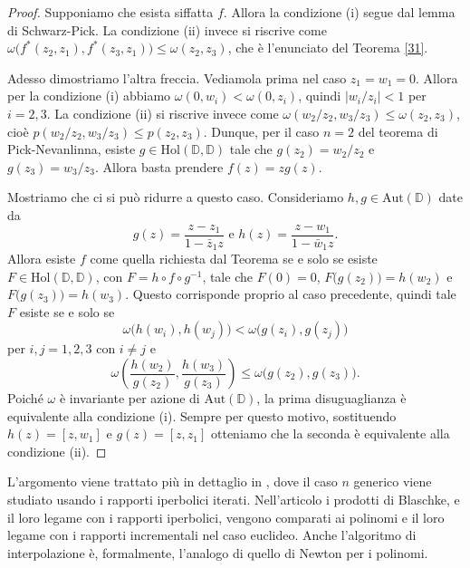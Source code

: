 \begin{proof}
  Supponiamo che esista siffatta $f$. Allora la condizione (i) segue dal lemma di Schwarz-Pick. La condizione (ii) invece si riscrive come $\omega\bigl(f^*(z_2,z_1),f^*(z_3,z_1)\bigr) \le \omega(z_2,z_3)$, che è l'enunciato del Teorema \ref{31}.

  Adesso dimostriamo l'altra freccia. Vediamola prima nel caso $z_1=w_1=0$. Allora per la condizione (i) abbiamo $\omega(0,w_i) < \omega(0,z_i)$, quindi $|w_i/z_i|<1$ per $i=2,3$. La condizione (ii) si riscrive invece come $\omega(w_2/z_2,w_3/z_3) \le \omega(z_2,z_3)$, cioè $p(w_2/z_2,w_3/z_3) \le p(z_2,z_3)$.
  Dunque, per il caso $n=2$ del teorema di Pick-Nevanlinna, esiste $g \in \text{Hol}(\mathbb{D},\mathbb{D})$ tale che $g(z_2)=w_2/z_2$ e $g(z_3)=w_3/z_3$. Allora basta prendere $f(z)=zg(z)$.

   Mostriamo che ci si può ridurre a questo caso. Consideriamo $h, g \in \text{Aut}(\mathbb{D})$ date da
   $$g(z)=\frac{z-z_1}{1-\bar{z}_1z} \,\, \text{e} \,\, h(z)=\frac{z-w_1}{1-\bar{w}_1z}.$$
   Allora esiste $f$ come quella richiesta dal Teorema se e solo se esiste $F \in \text{Hol}(\mathbb{D},\mathbb{D})$, con $F=h \circ f \circ g^{-1}$, tale che $F(0)=0$, $F\bigl(g(z_2)\bigr)=h(w_2)$ e $F\bigl(g(z_3)\bigr)=h(w_3)$.
   Questo corrisponde proprio al caso precedente, quindi tale $F$ esiste se e solo se
   $$\omega\bigl(h(w_i),h(w_j)\bigr) < \omega\bigl(g(z_i),g(z_j)\bigr)$$
   per $i,j=1,2,3$ con $i\not=j$ e
   $$\omega\left(\frac{h(w_2)}{g(z_2)},\frac{h(w_3)}{g(z_3)}\right) \le \omega\bigl(g(z_2),g(z_3)\bigr).$$
   Poiché $\omega$ è invariante per azione di $\text{Aut}(\mathbb{D})$, la prima disuguaglianza è equivalente alla condizione (i). Sempre per questo motivo, sostituendo $h(z)=[z,w_1]$ e $g(z)=[z,z_1]$ otteniamo che la seconda è equivalente alla condizione (ii).
\end{proof}

L'argomento viene trattato più in dettaglio in \cite{BRW}, dove il caso $n$ generico viene studiato usando i rapporti iperbolici iterati. Nell'articolo i prodotti di Blaschke, e il loro legame con i rapporti iperbolici, vengono comparati ai polinomi e il loro legame con i rapporti incrementali nel caso euclideo. Anche l'algoritmo di interpolazione è, formalmente, l'analogo di quello di Newton per i polinomi.
